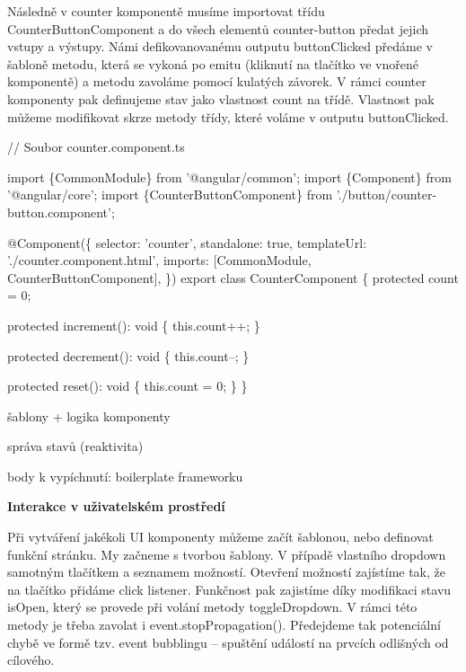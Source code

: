 Následně v counter komponentě musíme importovat třídu CounterButtonComponent a do všech elementů counter-button předat jejich vstupy a výstupy. 
Námi defikovanovanému outputu buttonClicked předáme v šabloně metodu, která se vykoná po emitu (kliknutí na tlačítko ve vnořené komponentě) a metodu zavoláme pomocí kulatých závorek. 
V rámci counter komponenty pak definujeme stav jako vlastnost count na třídě. Vlastnost pak můžeme modifikovat skrze metody třídy, které voláme v outputu buttonClicked.

\begin{prog}
// Soubor counter.component.ts

import \{CommonModule\} from '@angular/common';
import \{Component\} from '@angular/core';
import \{CounterButtonComponent\} from './button/counter-button.component';

@Component(\{
  selector: 'counter',
  standalone: true,
  templateUrl: './counter.component.html',
  imports: [CommonModule, CounterButtonComponent],
\})
export class CounterComponent \{
  protected count = 0;

  protected increment(): void \{
    this.count++;
  \}

  protected decrement(): void \{
    this.count--;
  \}

  protected reset(): void \{
    this.count = 0;
  \}
\}
\end{prog}

\begin{citemize}
	\item šablony + logika komponenty
	\item správa stavů (reaktivita)
	\item body k vypíchnutí: boilerplate frameworku
\end{citemize}

\begin{flushleft}
  \textbf{Interakce v uživatelském prostředí}
\end{flushleft}

Při vytváření jakékoli UI komponenty můžeme začít šablonou, nebo definovat funkční stránku. My začneme s tvorbou šablony. V případě vlastního dropdown samotným tlačítkem a seznamem možností. 
Otevření možností zajístíme tak, že na tlačítko přidáme click listener. Funkčnost pak zajistíme díky modifikaci stavu isOpen, který se provede při volání metody toggleDropdown. 
V rámci této metody je třeba zavolat i event.stopPropagation(). Předejdeme tak potenciální chybě ve formě tzv. event bubblingu -- spuštění událostí na prvcích odlišných od cílového.

